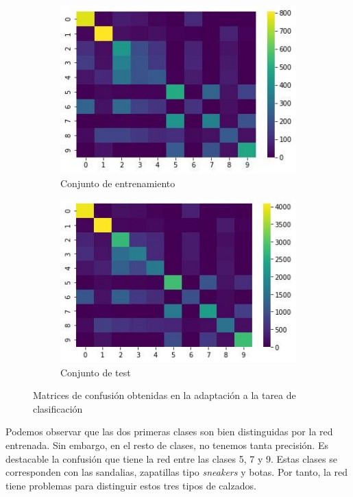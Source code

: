 \documentclass[11pt]{article}
\begin{document}
\begin{figure}[H]
    \centering

    \begin{subfigure}[b]{0.45 \textwidth}
        \includegraphics[width = 0.9 \textwidth]{triples_light_matrconf_entrenamiento}
        \caption{Conjunto de entrenamiento}
    \end{subfigure}
    \begin{subfigure}[b]{0.45 \textwidth}
        \includegraphics[width = 0.9 \textwidth]{triples_light_matrconf_test}
        \caption{Conjunto de test}
    \end{subfigure}

    \caption{Matrices de confusión obtenidas en la adaptación a la tarea de clasificación}
\end{figure}

Podemos observar que las dos primeras clases son bien distinguidas por la red entrenada. Sin embargo, en el resto de clases, no tenemos tanta precisión. Es destacable la confusión que tiene la red entre las clases 5, 7 y 9. Estas clases se corresponden con las sandalias, zapatillas tipo \emph{sneakers} y botas. Por tanto, la red tiene problemas para distinguir estos tres tipos de calzados.
\end{document}
